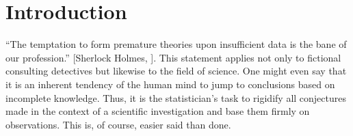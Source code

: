 
\chapter{Introduction}\label{chap:introduction}

\enquote{The temptation to form premature theories upon insufficient data is 
the bane of our profession.} [Sherlock Holmes, \citealt{Holmes}]. This 
statement applies not only to fictional consulting detectives but likewise to 
the field of science. One might even say that it is an inherent tendency of 
the human mind to jump to conclusions based on incomplete knowledge. Thus, it
is the statistician's task to rigidify all conjectures made in the context of
a scientific investigation and base them firmly on observations. This is, of
course, easier said than done.

